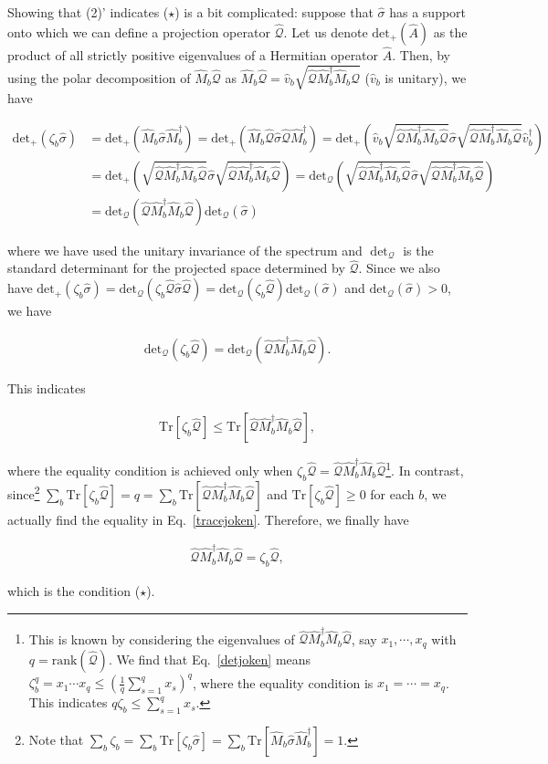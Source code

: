 \documentclass[preprint,pteplogo]{ptephy_v2}%
\numberwithin{equation}{section}
\theoremstyle{definition}
\newcommand{\ml}[1]{\mathcal{#1}}
\newcommand{\mr}[1]{\mathrm{#1}}
\newcommand{\lrs}[1]{\left( #1 \right)}
\newcommand{\aln}[1]{
\begin{align}
#1
\end{align}
}
\newcommand{\Tr}{\mr{Tr}}
\begin{document}
Showing that (2)' indicates ($\star$) is a bit complicated: suppose that $\hat{\sigma}$ has a support onto which we can define a projection operator  $\hat{\ml{Q}}$.
Let us denote $\mr{det}_+(\hat{A})$ as the product of all strictly positive eigenvalues of a Hermitian operator $\hat{A}$.
Then, by using the polar decomposition of $\hat{M}_b\hat{\ml{Q}}$ as $\hat{M}_b\hat{\ml{Q}}=\hat{v}_b\sqrt{\hat{\ml{Q}}\hat{M}_b^\dag\hat{M}_b\hat{\ml{Q}}}$ ($\hat{v}_b$ is unitary), we have
\aln{
\mr{det}_+({\zeta}_b\hat{\sigma})&=
\mr{det}_+(\hat{M}_b\hat{\sigma}\hat{M}_b^\dag)
=
\mr{det}_+(\hat{M}_b\hat{\ml{Q}}\hat{\sigma}\hat{\ml{Q}}\hat{M}_b^\dag)
=
\mr{det}_+\lrs{\hat{v}_b\sqrt{\hat{\ml{Q}}\hat{M}_b^\dag\hat{M}_b\hat{\ml{Q}}}\hat{\sigma}\sqrt{\hat{\ml{Q}}\hat{M}_b^\dag\hat{M}_b\hat{\ml{Q}}}\hat{v}_b^\dag}\nonumber\\
&=\mr{det}_+\lrs{\sqrt{\hat{\ml{Q}}\hat{M}_b^\dag\hat{M}_b\hat{\ml{Q}}}\hat{\sigma}\sqrt{\hat{\ml{Q}}\hat{M}_b^\dag\hat{M}_b\hat{\ml{Q}}}}=
\mr{det}_{\ml{Q}}\lrs{\sqrt{\hat{\ml{Q}}\hat{M}_b^\dag\hat{M}_b\hat{\ml{Q}}}\hat{\sigma}\sqrt{\hat{\ml{Q}}\hat{M}_b^\dag\hat{M}_b\hat{\ml{Q}}}}\nonumber\\
&=\mr{det}_{\ml{Q}}\lrs{{\hat{\ml{Q}}\hat{M}_b^\dag\hat{M}_b\hat{\ml{Q}}}}\mr{det}_{\ml{Q}}\lrs{\hat{\sigma}}
}
where we have used the unitary invariance of the spectrum and $\det_\mathcal{Q}$ is the standard determinant for the projected space determined by $\hat{\ml{Q}}$.
Since we also have $\mr{det}_+({\zeta}_b\hat{\sigma})=\mr{det}_\ml{Q}({\zeta}_b\hat{\ml{Q}}\hat{\sigma}\hat{\ml{Q}})=\mr{det}_\ml{Q}({\zeta}_b\hat{\ml{Q}})\mr{det}_\ml{Q}(\hat{\sigma})$ and $\mr{det}_\ml{Q}(\hat{\sigma})>0$, we have 
\aln{\label{detjoken}
\mr{det}_\ml{Q}({\zeta}_b\hat{\ml{Q}})=\mr{det}_{\ml{Q}}\lrs{{\hat{\ml{Q}}\hat{M}_b^\dag\hat{M}_b\hat{\ml{Q}}}}. 
}
This indicates 
\aln{\label{tracejoken}
\Tr[\zeta_b{\hat{\ml{Q}}}]\leq \Tr[\hat{\ml{Q}}\hat{M}_b^\dag\hat{M}_b\hat{\ml{Q}}],
}
where the equality condition is achieved only when $\zeta_b{\hat{\ml{Q}}}=\hat{\ml{Q}}\hat{M}_b^\dag\hat{M}_b\hat{\ml{Q}}$\footnote{
This is known by considering the eigenvalues of $\hat{\ml{Q}}\hat{M}_b^\dag\hat{M}_b\hat{\ml{Q}}$, say $x_1,\cdots, x_q$ with $q=\mr{rank}(\hat{\ml{Q}})$. 
We find that Eq.~\eqref{detjoken} means $\zeta_b^q=x_1\cdots x_q\leq \lrs{\frac{1}{q}\sum_{s=1}^qx_s}^q$, where the equality condition is $x_1=\cdots =x_q$. 
This indicates $q\zeta_b\leq \sum_{s=1}^qx_s$.
}.
In contrast, since\footnote{
Note that $\sum_b\zeta_b=\sum_b\Tr[\zeta_b\hat{\sigma}]=\sum_b\Tr[\hat{M}_b\hat{\sigma}\hat{M}_b^\dag]=1.$
} $\sum_b\Tr[\zeta_b{\hat{\ml{Q}}}]=q=\sum_b\Tr[\hat{\ml{Q}}\hat{M}_b^\dag\hat{M}_b\hat{\ml{Q}}]$ and $\Tr[\zeta_b{\hat{\ml{Q}}}]\geq 0$ for each $b$, we actually find the equality in Eq.~\eqref{tracejoken}.
Therefore, we finally have
\aln{
\hat{\ml{Q}}\hat{M}_b^\dag\hat{M}_b\hat{\ml{Q}}=\zeta_b\hat{\ml{Q}},
}
which is the condition ($\star$).
\end{document}
